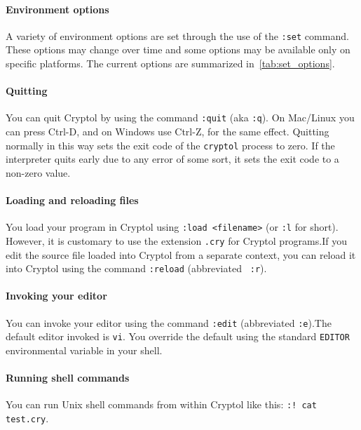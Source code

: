 \paragraph*{Environment options}
A variety of environment options are set through the use of the
\texttt{:set} command.  These options may change over time and some
options may be available only on specific platforms.  The current
options are summarized in~\autoref{tab:set_options}.


\paragraph*{Quitting}
You can quit Cryptol by using the command {\tt :quit} (aka \texttt{:q}).
On Mac/Linux you can press Ctrl-D, and on Windows use Ctrl-Z, for the
same effect. Quitting normally in this way sets the exit code of the
\texttt{cryptol} process to zero. If the interpreter quits early due to
any error of some sort, it sets the exit code to a non-zero
value.\indCmdQuit

\paragraph*{Loading and reloading files}
You load your program in Cryptol using {\tt :load <filename>} (or
\texttt{:l} for short).  However, it is customary to use the extension
{\tt .cry} for Cryptol programs.\indCmdLoad If you edit the source
file loaded into Cryptol from a separate context, you can reload it
into Cryptol using the command {\tt :reload} (abbreviated {\tt
  :r}).\indCmdReload

\paragraph*{Invoking your editor}
You can invoke your editor using the command {\tt :edit} (abbreviated
\texttt{:e}).\indCmdEdit The default editor invoked is
\texttt{vi}.  You override the default using the standard
\texttt{EDITOR} environmental variable in your shell.\indSettingEditor


\paragraph*{Running shell commands}
You can run Unix shell commands from within Cryptol like this: {\tt :!
  cat test.cry}.\indCmdShell

